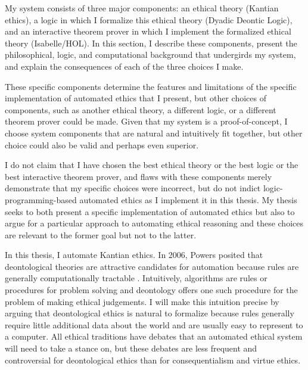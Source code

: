 %
\begin{isabellebody}%
%
%
\isadelimtheory
%
\endisadelimtheory
%
\isatagtheory
%
\endisatagtheory
{\isafoldtheory}%
%
\isadelimtheory
%
\endisadelimtheory
%
\isadelimdocument
%
\endisadelimdocument
%
\isatagdocument
%
\isamarkuptrue%
%
\endisatagdocument
{\isafolddocument}%
%
\isadelimdocument
%
\endisadelimdocument
%
\begin{isamarkuptext}%
My system consists of three major components: an ethical theory (Kantian ethics), a logic in which
I formalize this ethical theory (Dyadic Deontic Logic), and an interactive theorem prover in which I 
implement the formalized ethical theory (Isabelle/HOL). In this section, I describe these components, 
present the philosophical, logic, and computational background that undergirds my system, and explain
the consequences of each of the three choices I make. 

These specific components determine the features
and limitations of the specific implementation of automated ethics that I present, but other choices of 
components, such as another ethical theory, a different logic, or a different theorem prover could be 
made. Given that my system is a proof-of-concept, I choose system components that are natural and 
intuitively fit together, but other choice could also be valid and perhaps even superior. 

I do not claim
that I have chosen the best ethical theory or the best logic or the best interactive theorem prover, 
and flaws with these components merely demonstrate that my specific choices were incorrect, but do not 
indict logic-programming-based automated ethics as I implement it in this thesis. My thesis seeks to 
both present a specific implementation of automated ethics but also to argue for a particular approach 
to automating ethical reasoning and these choices are relevant to the former goal but not to the latter.%
\end{isamarkuptext}\isamarkuptrue%
%
\isadelimdocument
%
\endisadelimdocument
%
\isatagdocument
%
\isamarkuptrue%
%
\endisatagdocument
{\isafolddocument}%
%
\isadelimdocument
%
\endisadelimdocument
%
\begin{isamarkuptext}%
In this thesis, I automate Kantian ethics. In 2006, Powers posited that deontological theories are 
attractive candidates for automation because rules are generally computationally tractable \cite[1]{powers}. 
Intuitively, algorithms are rules or procedures for problem solving and deontology offers one such 
procedure for the problem of making ethical judgements. I will make this intuition precise by
arguing that deontological ethics is natural to formalize because rules generally require little additional
data about the world and are usually easy to represent to a computer. All ethical traditions have debates that an 
automated ethical system will need to take a stance on, but these debates are less frequent and controversial
for deontological ethics than for consequentialism and virtue ethics.


\end{isamarkuptext}
\end{isabellebody}
